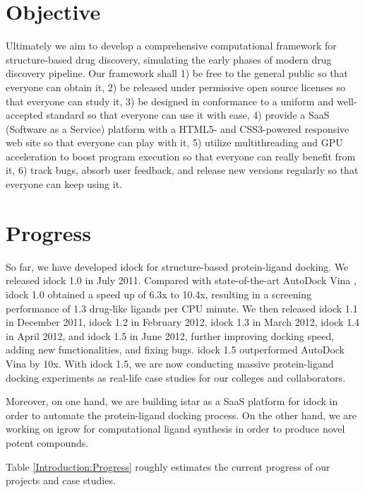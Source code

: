 \section{Objective}

Ultimately we aim to develop a comprehensive computational framework for structure-based drug discovery, simulating the early phases of modern drug discovery pipeline. Our framework shall 1) be free to the general public so that everyone can obtain it, 2) be released under permissive open source licenses so that everyone can study it, 3) be designed in conformance to a uniform and well-accepted standard so that everyone can use it with ease, 4) provide a SaaS (Software as a Service) platform with a HTML5- and CSS3-powered responsive web site so that everyone can play with it, 5) utilize multithreading and GPU acceleration to boost program execution so that everyone can really benefit from it, 6) track bugs, absorb user feedback, and release new versions regularly so that everyone can keep using it.

\section{Progress}

So far, we have developed idock for structure-based protein-ligand docking. We released idock 1.0 in July 2011. Compared with state-of-the-art AutoDock Vina \citep{595}, idock 1.0 obtained a speed up of 6.3x to 10.4x, resulting in a screening performance of 1.3 drug-like ligands per CPU minute. We then released idock 1.1 in December 2011, idock 1.2 in February 2012, idock 1.3 in March 2012, idock 1.4 in April 2012, and idock 1.5 in June 2012, further improving docking speed, adding new functionalities, and fixing bugs. idock 1.5 outperformed AutoDock Vina by 10x. With idock 1.5, we are now conducting massive protein-ligand docking experiments as real-life case studies for our colleges and collaborators.

Moreover, on one hand, we are building istar as a SaaS platform for idock in order to automate the protein-ligand docking process. On the other hand, we are working on igrow for computational ligand synthesis in order to produce novel potent compounds.

Table \ref{Introduction:Progress} roughly estimates the current progress of our projects and case studies.

